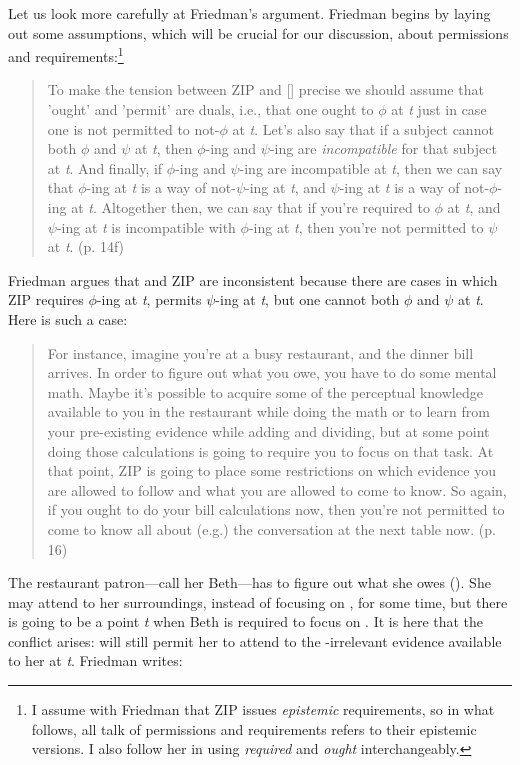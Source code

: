 \documentclass[12pt]{article}
\begin{document}
Let us look more carefully at Friedman’s argument. Friedman begins by laying out some assumptions, which will be crucial for our discussion, about permissions and requirements:\footnote{I assume with Friedman that ZIP issues \textit{epistemic} requirements, so in what follows, all talk of permissions and requirements refers to their epistemic versions. I also follow her in using \textit{required} and \textit{ought} interchangeably.}

\begin{quote}
    To make the tension between ZIP and [\ep{}] precise we should assume that 'ought' and 'permit' are duals, i.e., that one ought to $\phi$ at \textit{t} just in case one is not permitted to not-$\phi$ at \textit{t}. Let's also say that if a subject cannot both $\phi$ and $\psi$ at \textit{t}, then $\phi$-ing and $\psi$-ing are \textit{incompatible} for that subject at \textit{t}. And finally, if $\phi$-ing and $\psi$-ing are incompatible at \textit{t}, then we can say that $\phi$-ing at \textit{t} is a way of not-$\psi$-ing at \textit{t}, and $\psi$-ing at \textit{t} is a way of not-$\phi$-ing at \textit{t}. Altogether then, we can say that if you're required to $\phi$ at \textit{t}, and $\psi$-ing at \textit{t} is incompatible with $\phi$-ing at \textit{t}, then you're not permitted to $\psi$ at \textit{t}. (p. 14f)
\end{quote}
%
Friedman argues that \ep{} and ZIP are inconsistent because there are cases in which ZIP requires $\phi$-ing at \textit{t}, \ep{} permits $\psi$-ing at \textit{t}, but one cannot both $\phi$ and $\psi$ at \textit{t}. Here is such a case:

\begin{quote}
    For instance, imagine you're at a busy restaurant, and the dinner bill arrives. In order to figure out what you owe, you have to do some mental math. Maybe it’s possible to acquire some of the perceptual knowledge available to you in the restaurant while doing the math or to learn from your pre-existing evidence while adding and dividing, but at some point doing those calculations is going to require you to focus on that task. At that point, ZIP is going to place some restrictions on which evidence you are allowed to follow and what you are allowed to come to know. So again, if you ought to do your bill calculations now, then you’re not permitted to come to know all about (e.g.) the conversation at the next table now. (p. 16)
\end{quote}
%
The restaurant patron---call her Beth---has to figure out what she owes (). She may attend to her surroundings, instead of focusing on , for some time, but there is going to be a point \textit{t} when Beth is required to focus on . It is here that the conflict arises: \ep{} will still permit her to attend to the -irrelevant evidence available to her at \textit{t}. Friedman writes:
\end{document}
